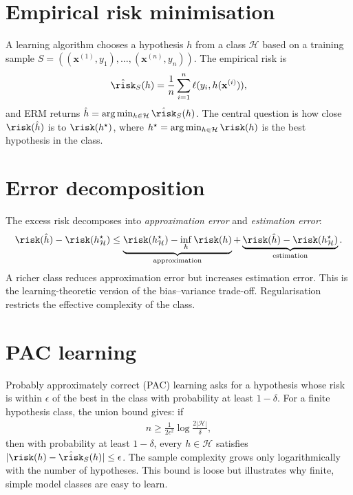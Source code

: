 \documentclass[a4paper, 12pt]{book}
\begin{document}
\section{Empirical risk minimisation}

A learning algorithm chooses a hypothesis $h$ from a class $\mathcal{H}$ based on a
training sample $S=((\mathbf{x}^{(1)},y_1),\ldots,(\mathbf{x}^{(n)},y_n))$. The
empirical risk is
\begin{align}
    \hat{\risk}_S(h) = \frac{1}{n}\sum_{i=1}^n \ell(y_i,h(\mathbf{x}^{(i)})),
\end{align}
and ERM returns $\hat{h}=\arg\min_{h\in\mathcal{H}}\hat{\risk}_S(h)$. The central
question is how close $\risk(\hat{h})$ is to $\risk(h^\star)$, where
$h^\star=\arg\min_{h\in\mathcal{H}}\risk(h)$ is the best hypothesis in the class.

\section{Error decomposition}

The excess risk decomposes into \emph{approximation error} and \emph{estimation
error}:
\begin{align}
    \risk(\hat{h}) - \risk(h^\star_{\mathcal{H}})
    \leq \underbrace{\risk(h^\star_{\mathcal{H}}) -
      \inf_{h}\risk(h)}_{\text{approximation}}
    + \underbrace{\risk(\hat{h}) - \risk(h^\star_{\mathcal{H}})}_{\text{estimation}}.
\end{align}
A richer class reduces approximation error but increases estimation error. This is
the learning-theoretic version of the bias--variance trade-off. Regularisation
restricts the effective complexity of the class.

\section{PAC learning}

Probably approximately correct (PAC) learning asks for a hypothesis whose risk is
within $\epsilon$ of the best in the class with probability at least $1-\delta$. For a
finite hypothesis class, the union bound gives: if
\begin{align}
    n \geq \frac{1}{2\epsilon^2}
    \log\frac{2|\mathcal{H}|}{\delta},
\end{align}
then with probability at least $1-\delta$, every $h\in\mathcal{H}$ satisfies
$|\risk(h)-\hat{\risk}_S(h)| \leq \epsilon$. The sample complexity grows only
logarithmically with the number of hypotheses. This bound is loose but illustrates why
finite, simple model classes are easy to learn.
\end{document}
